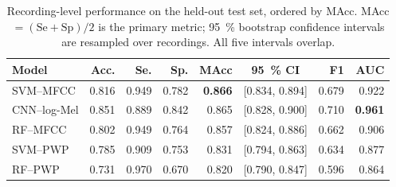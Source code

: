 \begin{table}[t]
\centering
\caption{Recording-level performance on the held-out test set, ordered by MAcc.
MAcc $=(\mathrm{Se}+\mathrm{Sp})/2$ is the primary metric; \SI{95}{\percent}
bootstrap confidence intervals are resampled over recordings. All five intervals
overlap.}
\label{tab:results}
\setlength{\tabcolsep}{3.5pt}
\begin{tabular}{lrrrrcrr}
\toprule
Model & Acc. & Se. & Sp. & MAcc & \SI{95}{\percent} CI & F1 & AUC \\
\midrule
SVM--MFCC     & 0.816 & 0.949 & 0.782 & \textbf{0.866} & [0.834, 0.894] & 0.679 & 0.922 \\
CNN--log-Mel  & 0.851 & 0.889 & 0.842 & 0.865 & [0.828, 0.900] & 0.710 & \textbf{0.961} \\
RF--MFCC      & 0.802 & 0.949 & 0.764 & 0.857 & [0.824, 0.886] & 0.662 & 0.906 \\
SVM--PWP      & 0.785 & 0.909 & 0.753 & 0.831 & [0.794, 0.863] & 0.634 & 0.877 \\
RF--PWP       & 0.731 & 0.970 & 0.670 & 0.820 & [0.790, 0.847] & 0.596 & 0.864 \\
\bottomrule
\end{tabular}
\end{table}
